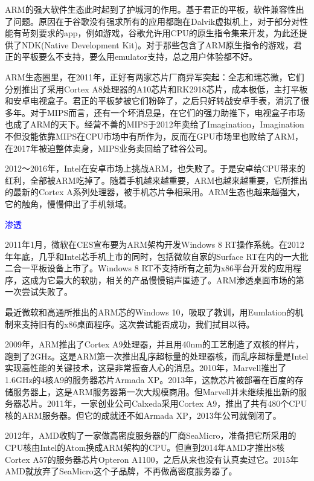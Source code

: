 \documentclass[utf8]{book}
\begin{document}
	ARM的强大软件生态此时起到了护城河的作用。基于君正的平板，软件兼容性出了问题。原因在于谷歌没有强求所有的应用都跑在Dalvik虚拟机上，对于部分对性能有苛刻要求的app，例如游戏，谷歌允许用CPU的原生指令集来开发，为此还提供了NDK(Native Development Kit)。对于那些包含了ARM原生指令的游戏，君正的平板要么不支持，要么用emulator支持，总之用户体验都不好。
	
	ARM生态圈里，在2011年，正好有两家芯片厂商异军突起：全志和瑞芯微，它们分别推出了采用Cortex A8处理器的A10芯片和RK2918芯片，成本极低，主打平板和安卓电视盒子。君正的平板梦被它们粉碎了，之后只好转战安卓手表，消沉了很多年。对于MIPS而言，还有一个坏消息是，在它们的强力助推下，电视盒子市场也成了ARM的天下。经营不善的MIPS于2012年卖给了Imagination，Imagination不但没能依靠MIPS在CPU市场中有所作为，反而在GPU市场里也败给了ARM，在2017年被迫整体卖身，MIPS业务卖回给了硅谷公司。
	
	2012～2016年，Intel在安卓市场上挑战ARM，也失败了。于是安卓给CPU带来的红利，全部被ARM吃掉了。随着手机越来越重要，ARM也越来越重要，它所推出的最新的Cortex A系列处理器，被手机芯片争相采用。ARM生态也越来越强大，它的触角，慢慢伸出了手机领域。
	
	\begin{flushleft}
		{\LARGE  \textcolor{blue}{渗透}}
	\end{flushleft}
	
	2011年1月，微软在CES宣布要为ARM架构开发Windows 8 RT操作系统。在2012年年底，几乎和Intel芯手机上市的同时，包括微软自家的Surface RT在内的一大批二合一平板设备上市了。Windows 8 RT不支持所有之前为x86平台开发的应用程序，这成为它最大的软肋，相关的产品慢慢销声匿迹了。ARM渗透桌面市场的第一次尝试失败了。
	
	最近微软和高通所推出的ARM芯的Windows 10，吸取了教训，用Eumlation的机制来支持旧有的x86桌面程序。这次尝试能否成功，我们拭目以待。
	
	2009年，ARM推出了Cortex A9处理器，并且用40nm的工艺制造了双核的样片，跑到了2GHz。这是ARM第一次推出乱序超标量的处理器核，而乱序超标量是Intel实现高性能的关键技术，这是非常振奋人心的消息。2010年，Marvell推出了1.6GHz的4核A9的服务器芯片Armada
	 XP。2013年，这款芯片被部署在百度的存储服务器上，这是ARM服务器第一次大规模商用。但Marvell并未继续推出新的服务器芯片。2011年，一家创业公司Calxeda采用Cortex A9，推出了共有480个CPU核的ARM服务器。但它的成就还不如Armada XP，2013年公司就倒闭了。
	 
	2012年，AMD收购了一家做高密度服务器的厂商SeaMicro，准备把它所采用的CPU核由Intel的Atom换成ARM架构的CPU。但直到2014年AMD才推出8核Cortex A57的服务器芯片Opteron A1100，之后从来也没有认真卖过它。2015年AMD就放弃了SeaMicro这个子品牌，不再做高密度服务器了。
	
\end{document}
